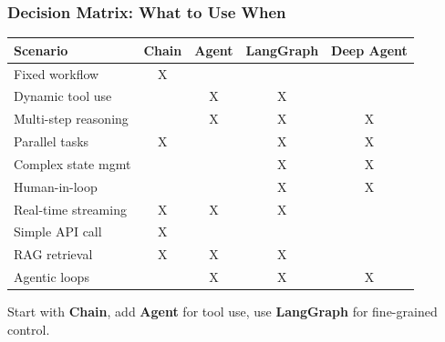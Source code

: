 \documentclass[aspectratio=169,11pt]{beamer}
\begin{document}
\begin{frame}
  \frametitle{Decision Matrix: What to Use When}

  \begin{center}
    \small
    \begin{tabular}{l|c|c|c|c}
      \toprule
      \textbf{Scenario} & \textbf{Chain} & \textbf{Agent} & \textbf{LangGraph} & \textbf{Deep Agent} \\
      \midrule
      Fixed workflow & X & & & \\
      Dynamic tool use & & X & X & \\
      Multi-step reasoning & & X & X & X \\
      Parallel tasks & X & & X & X \\
      Complex state mgmt & & & X & X \\
      Human-in-loop & & & X & X \\
      Real-time streaming & X & X & X & \\
      Simple API call & X & & & \\
      RAG retrieval & X & X & X & \\
      Agentic loops & & X & X & X \\
      \bottomrule
    \end{tabular}
  \end{center}

  \vspace{0.5cm}
  \begin{tipbox}
    \small Start with \textbf{Chain}, add \textbf{Agent} for tool use, use \textbf{LangGraph} for fine-grained control.
  \end{tipbox}
\end{frame}
\end{document}
